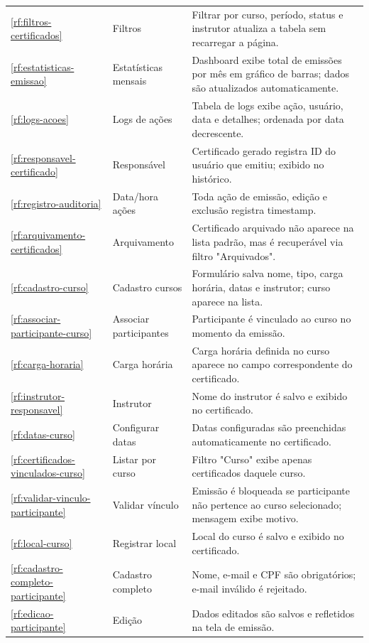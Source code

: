 \begin{longtable}{p{1cm} p{3.2cm} p{10.8cm}}
\ref{rf:filtros-certificados} & Filtros & Filtrar por curso, período, status e instrutor atualiza a tabela sem recarregar a página. \\
\ref{rf:estatisticas-emissao} & Estatísticas mensais & Dashboard exibe total de emissões por mês em gráfico de barras; dados são atualizados automaticamente. \\
\ref{rf:logs-acoes} & Logs de ações & Tabela de logs exibe ação, usuário, data e detalhes; ordenada por data decrescente. \\
\midrule
\ref{rf:responsavel-certificado} & Responsável & Certificado gerado registra ID do usuário que emitiu; exibido no histórico. \\
\ref{rf:registro-auditoria} & Data/hora ações & Toda ação de emissão, edição e exclusão registra timestamp. \\
\ref{rf:arquivamento-certificados} & Arquivamento & Certificado arquivado não aparece na lista padrão, mas é recuperável via filtro "Arquivados". \\
\midrule
\ref{rf:cadastro-curso} & Cadastro cursos & Formulário salva nome, tipo, carga horária, datas e instrutor; curso aparece na lista. \\
\ref{rf:associar-participante-curso} & Associar participantes & Participante é vinculado ao curso no momento da emissão. \\
\ref{rf:carga-horaria} & Carga horária & Carga horária definida no curso aparece no campo correspondente do certificado. \\
\ref{rf:instrutor-responsavel} & Instrutor & Nome do instrutor é salvo e exibido no certificado. \\
\ref{rf:datas-curso} & Configurar datas & Datas configuradas são preenchidas automaticamente no certificado. \\
\ref{rf:certificados-vinculados-curso} & Listar por curso & Filtro "Curso" exibe apenas certificados daquele curso. \\
\ref{rf:validar-vinculo-participante} & Validar vínculo & Emissão é bloqueada se participante não pertence ao curso selecionado; mensagem exibe motivo. \\
\ref{rf:local-curso} & Registrar local & Local do curso é salvo e exibido no certificado. \\
\midrule
\ref{rf:cadastro-completo-participante} & Cadastro completo & Nome, e-mail e CPF são obrigatórios; e-mail inválido é rejeitado. \\
\ref{rf:edicao-participante} & Edição & Dados editados são salvos e refletidos na tela de emissão. \\

\end{longtable}
